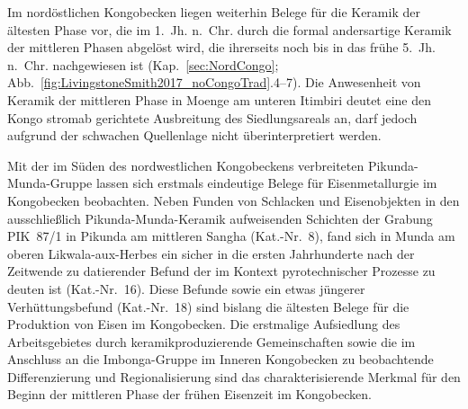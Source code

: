 Im nordöstlichen Kongobecken liegen weiterhin Belege für die Keramik der ältesten Phase vor, die im 1.~Jh. n.~Chr. durch die formal andersartige Keramik der mittleren Phasen abgelöst wird, die ihrerseits noch bis in das frühe 5.~Jh. n.~Chr. nachgewiesen ist (Kap.~\ref{sec:NordCongo}; Abb.~\ref{fig:LivingstoneSmith2017_noCongoTrad}.4--7). Die Anwesenheit von Keramik der mittleren Phase in Moenge am unteren Itimbiri deutet eine den Kongo stromab gerichtete Ausbreitung des Siedlungsareals an, darf jedoch aufgrund der schwachen Quellenlage nicht überinterpretiert werden.

Mit der im Süden des nordwestlichen Kongobeckens verbreiteten Pikunda-Munda-Gruppe lassen sich erstmals eindeutige Belege für Eisenmetallurgie im Kongobecken beobachten. Neben Funden von Schlacken und Eisenobjekten in den ausschließlich Pikunda-Munda-Keramik aufweisenden Schichten der Grabung PIK~87/1 in Pikunda am mittleren \mbox{Sangha} (Kat.-Nr.~8), fand sich in Munda am oberen \mbox{Likwala}-\mbox{aux}-\mbox{Herbes} ein sicher in die ersten Jahrhunderte nach der Zeitwende zu datierender Befund der im Kontext pyrotechnischer Prozesse zu deuten ist (Kat.-Nr.~16). Diese Befunde sowie ein etwas jüngerer Verhüttungsbefund (Kat.-Nr.~18) sind bislang die ältesten Belege für die Produktion von Eisen im Kongobecken. Die erstmalige Aufsiedlung des Arbeitsgebietes durch keramikproduzierende Gemeinschaften sowie die im Anschluss an die Imbonga-Gruppe im Inneren Kongobecken zu beobachtende Differenzierung und Regionalisierung sind das charakterisierende Merkmal für den Beginn der mittleren Phase der frühen Eisenzeit im Kongobecken.

